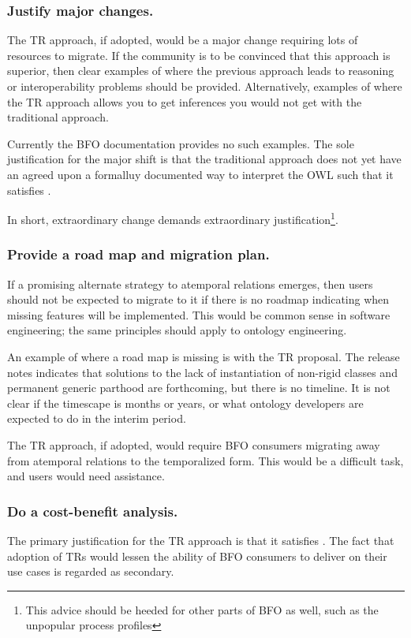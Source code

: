 \documentclass{bioinfo}
\def\P1{\pr{P-1}}
\begin{document}
\subsubsection{Justify major changes.} The TR approach, if adopted,
would be a major change requiring lots of resources to migrate. If the
community is to be convinced that this approach is superior, then
clear examples of where the previous approach leads to reasoning or
interoperability problems should be provided. Alternatively, examples
of where the TR approach allows you to get inferences you would not
get with the traditional approach.

Currently the BFO documentation provides no such examples. The sole
justification for the major shift is that the traditional approach
does not yet have an agreed upon a formalluy documented way to
interpret the OWL such that it satisfies \P1.

In short, extraordinary change demands extraordinary
justification\footnote{This advice should be heeded for other parts of
  BFO as well, such as the unpopular process profiles}.

\subsubsection{Provide a road map and migration plan.} If a promising
alternate strategy to atemporal relations emerges, then users should
not be expected to migrate to it if there is no roadmap indicating
when missing features will be implemented. This would be common sense
in software engineering; the same principles should apply to ontology
engineering.

An example of where a road map is missing is with the TR proposal. The
release notes indicates that solutions to the lack of instantiation of
non-rigid classes and permanent generic parthood are forthcoming, but
there is no timeline. It is not clear if the timescape is months or
years, or what ontology developers are expected to do in the interim
period.

The TR approach, if adopted, would require BFO consumers migrating
away from atemporal relations to the temporalized form. This would be
a difficult task, and users would need assistance.

\subsubsection{Do a cost-benefit analysis.} The primary
justification for the TR approach is that it satisfies \P1. The fact
that adoption of TRs would lessen the ability of BFO consumers to
deliver on their use cases is regarded as secondary.
\end{document}
